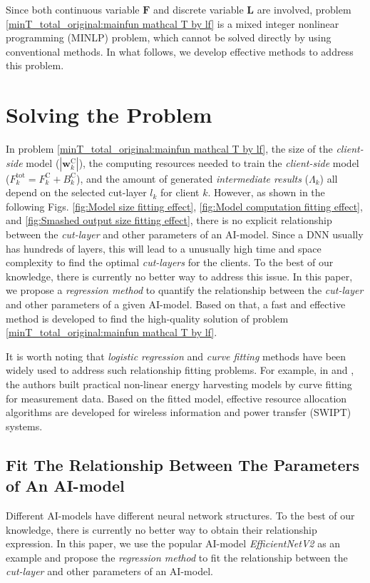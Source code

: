 \documentclass[10pt,journal,transmag]{IEEEtran}
\begin{document}
Since both continuous variable $\textbf{F}$ and discrete variable $\textbf{L}$ are involved, problem \eqref{minT_total_original:mainfun mathcal T by lf} is a mixed integer nonlinear programming (MINLP) problem, which cannot be solved directly by using conventional methods. In what follows, we develop effective methods to address this problem.

\section{Solving the Problem}
In problem \eqref{minT_total_original:mainfun mathcal T by lf}, the size of the \textit{client-side} model ($|\textbf{w}^\text{C}_k|$), the computing resources needed to train the \textit{client-side} model ($F_k^\text{tot}=F_k^\text{C}+B_k^\text{C}$), and the amount of generated \textit{intermediate results} ($\Lambda_k$) all depend on the selected cut-layer $l_k$ for client $k$.
However, as shown in the following Figs. \ref{fig:Model size fitting effect}, \ref{fig:Model computation fitting effect}, and \ref{fig:Smashed output size fitting effect}, there is no explicit relationship between the \textit{cut-layer} and other parameters of an AI-model. 
Since a DNN usually has hundreds of layers, this will lead to a unusually high time and space complexity to find the optimal \textit{cut-layers} for the clients. 
To the best of our knowledge, there is currently no better way to address this issue. In this paper, we propose a \textit{regression method} to quantify the relationship between the \textit{cut-layer} and other parameters of a given AI-model. Based on that, a fast and effective method is developed to find the high-quality solution of problem \eqref{minT_total_original:mainfun mathcal T by lf}.

It is worth noting that \textit{logistic regression} and \textit{curve fitting} methods have been widely used to address such relationship fitting problems. For example, in \cite{Boshkovska2015PracticalNE} and \cite{9354851}, the authors built practical non-linear energy harvesting models by curve fitting for measurement data. Based on the fitted model, effective resource allocation algorithms are developed for wireless information and power transfer (SWIPT) systems.


\subsection{Fit The Relationship Between The Parameters of An AI-model}
Different AI-models have different neural network structures.
To the best of our knowledge, there is currently no better way to obtain their relationship expression.
In this paper, we use the popular AI-model \textit{EfficientNetV2}\cite{tan2021efficientnetv2} as an example and propose the \textit{regression method} to fit the relationship between the \textit{cut-layer} and other parameters of an AI-model.
\end{document}
